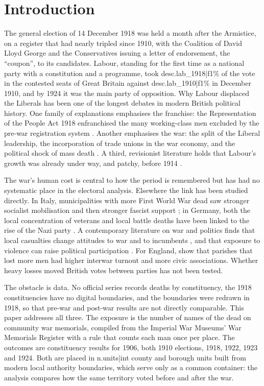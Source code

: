 \documentclass[11pt,a4paper]{article}
\begin{document}
\section{Introduction}
The general election of 14 December 1918 was held a month after the Armistice, on a register that had nearly tripled since 1910, with the Coalition of David Lloyd George and the Conservatives issuing a letter of endorsement, the ``coupon'', to its candidates. Labour, standing for the first time as a national party with a constitution and a programme, took {{desc.lab_1918|f1}}\% of the vote in the contested seats of Great Britain against {{desc.lab_1910|f1}}\% in December 1910, and by 1924 it was the main party of opposition. Why Labour displaced the Liberals has been one of the longest debates in modern British political history. One family of explanations emphasises the franchise: the Representation of the People Act 1918 enfranchised the many working-class men excluded by the pre-war registration system \citep{matthew1976,blewett1965}. Another emphasises the war: the split of the Liberal leadership, the incorporation of trade unions in the war economy, and the political shock of mass death \citep{wilson1966,mckibbin1974,turner1992}. A third, revisionist literature holds that Labour's growth was already under way, and patchy, before 1914 \citep{clarke1971,tanner1990,laybourn1995}.

The war's human cost is central to how the period is remembered but has had no systematic place in the electoral analysis. Elsewhere the link has been studied directly. In Italy, municipalities with more First World War dead saw stronger socialist mobilisation and then stronger fascist support \citep{acemoglu2022}; in Germany, both the local concentration of veterans and local battle deaths have been linked to the rise of the Nazi party \citep{koenig2023,dejuan2024}. A contemporary literature on war and politics finds that local casualties change attitudes to war and to incumbents \citep{gartner1997,karol2007,kriner2007}, and that exposure to violence can raise political participation \citep{blattman2009,bellows2009,bauer2016}. For England, \citet{carozzi2023} show that parishes that lost more men had higher interwar turnout and more civic associations. Whether heavy losses moved British votes between parties has not been tested.

The obstacle is data. No official series records deaths by constituency, the 1918 constituencies have no digital boundaries, and the boundaries were redrawn in 1918, so that pre-war and post-war results are not directly comparable. This paper addresses all three. The exposure is the number of names of the dead on community war memorials, compiled from the Imperial War Museums' War Memorials Register with a rule that counts each man once per place. The outcomes are constituency results for 1906, both 1910 elections, 1918, 1922, 1923 and 1924. Both are placed in {{n.units|int}} county and borough units built from modern local authority boundaries, which serve only as a common container: the analysis compares how the same territory voted before and after the war.
\end{document}
